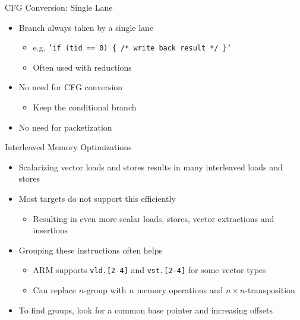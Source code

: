 
\begin{frame}{CFG Conversion: Single Lane}

\begin{itemize}
    \item Branch always taken by a single lane
    \begin{itemize}
        \item e.g. \texttt{'if (tid == 0) \{ /* write back result */ \}'}
        \item Often used with reductions
    \end{itemize}
    \item No need for CFG conversion
    \begin{itemize}
        \item Keep the conditional branch
    \end{itemize}
    \item No need for packetization
\end{itemize}

\end{frame}


\begin{frame}{Interleaved Memory Optimizations}

\begin{itemize}
    \item Scalarizing vector loads and stores results in many interleaved loads and stores
    \item Most targets do not support this efficiently
    \begin{itemize}
        \item Resulting in even more scalar loads, stores, vector extractions and insertions
    \end{itemize}
    \item Grouping these instructions often helps
    \begin{itemize}
        \item ARM supports \texttt{vld.[2-4]} and \texttt{vst.[2-4]} for some vector types
        \item Can replace $n$-group with $n$ memory operations and $n \times n$-transposition 
    \end{itemize}
    \item To find groups, look for a common base pointer and increasing offsets
\end{itemize}

\end{frame}

